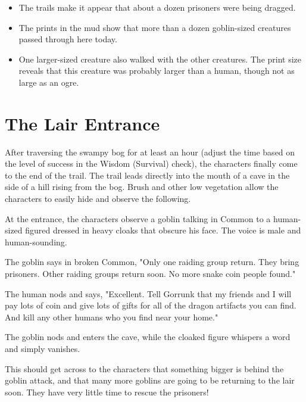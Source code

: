 \documentclass[10pt,a4paper,twoside,bg=print,twocolumn,openany,nodeprecatedcode]{dndbook}
\begin{document}
\begin{itemize}
\item The trails make it appear that about a dozen prisoners were being dragged.
\item The prints in the mud show that more than a dozen goblin-sized creatures passed through here today.
\item One larger-sized creature also walked with the other creatures. The print size reveals that this creature was probably larger than a human, though not as large as an ogre.
\end{itemize}

\section{The Lair Entrance}
After traversing the swampy bog for at least an hour (adjust the time based on the level of success in the Wisdom (Survival) check), the characters finally come to the end of the trail. The trail leads directly into the mouth of a cave in the side of a hill rising from the bog. Brush and other low vegetation allow the characters to easily hide and observe the following.

At the entrance, the characters observe a goblin talking in Common to a human-sized figured dressed in heavy cloaks that obscure his face. The voice is male and human-sounding.

\begin{DndReadAloud}{}
The goblin says in broken Common, "Only one raiding group return. They bring prisoners. Other raiding groups return soon. No more snake coin people found."

\end{DndReadAloud}

The human nods and says, "Excellent. Tell Gorrunk that my friends and I will pay lots of coin and give lots of gifts for all of the dragon artifacts you can find. And kill any other humans who you find near your home."

\begin{DndReadAloud}{}
The goblin nods and enters the cave, while the cloaked figure whispers a word and simply vanishes.

\end{DndReadAloud}

This should get across to the characters that something bigger is behind the goblin attack, and that many more goblins are going to be returning to the lair soon. They have very little time to rescue the prisoners!
\end{document}
